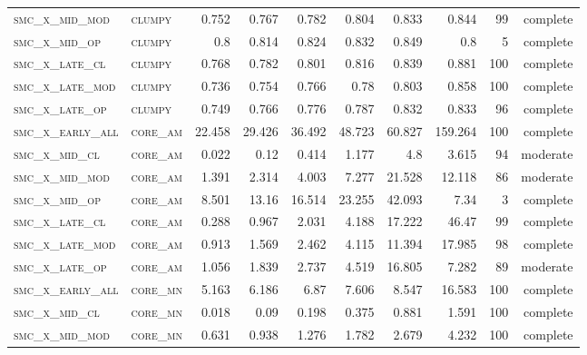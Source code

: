 \begin{landscape}
\begin{center}
\begin{footnotesize}
\begin{longtable}{llrrrrr|rrr}
\textsc{smc\_x\_mid\_mod  } & \textsc{clumpy    }   & 0.752    & 0.767    & 0.782    & 0.804    & 0.833    & 0.844    & 99  & complete \\
\textsc{smc\_x\_mid\_op   } & \textsc{clumpy    }   & 0.8      & 0.814    & 0.824    & 0.832    & 0.849    & 0.8      & 5   & complete \\
\textsc{smc\_x\_late\_cl  } & \textsc{clumpy    }   & 0.768    & 0.782    & 0.801    & 0.816    & 0.839    & 0.881    & 100 & complete \\
\textsc{smc\_x\_late\_mod } & \textsc{clumpy    }   & 0.736    & 0.754    & 0.766    & 0.78     & 0.803    & 0.858    & 100 & complete \\
\textsc{smc\_x\_late\_op  } & \textsc{clumpy    }   & 0.749    & 0.766    & 0.776    & 0.787    & 0.832    & 0.833    & 96  & complete \\
\textsc{smc\_x\_early\_all} & \textsc{core\_am  }   & 22.458   & 29.426   & 36.492   & 48.723   & 60.827   & 159.264  & 100 & complete \\
\textsc{smc\_x\_mid\_cl   } & \textsc{core\_am  }   & 0.022    & 0.12     & 0.414    & 1.177    & 4.8      & 3.615    & 94  & moderate \\
\textsc{smc\_x\_mid\_mod  } & \textsc{core\_am  }   & 1.391    & 2.314    & 4.003    & 7.277    & 21.528   & 12.118   & 86  & moderate \\
\textsc{smc\_x\_mid\_op   } & \textsc{core\_am  }   & 8.501    & 13.16    & 16.514   & 23.255   & 42.093   & 7.34     & 3   & complete \\
\textsc{smc\_x\_late\_cl  } & \textsc{core\_am  }   & 0.288    & 0.967    & 2.031    & 4.188    & 17.222   & 46.47    & 99  & complete \\
\textsc{smc\_x\_late\_mod } & \textsc{core\_am  }   & 0.913    & 1.569    & 2.462    & 4.115    & 11.394   & 17.985   & 98  & complete \\
\textsc{smc\_x\_late\_op  } & \textsc{core\_am  }   & 1.056    & 1.839    & 2.737    & 4.519    & 16.805   & 7.282    & 89  & moderate \\
\textsc{smc\_x\_early\_all} & \textsc{core\_mn  }   & 5.163    & 6.186    & 6.87     & 7.606    & 8.547    & 16.583   & 100 & complete \\
\textsc{smc\_x\_mid\_cl   } & \textsc{core\_mn  }   & 0.018    & 0.09     & 0.198    & 0.375    & 0.881    & 1.591    & 100 & complete \\
\textsc{smc\_x\_mid\_mod  } & \textsc{core\_mn  }   & 0.631    & 0.938    & 1.276    & 1.782    & 2.679    & 4.232    & 100 & complete \\

\end{longtable}
\end{footnotesize}
\end{center}
\end{landscape}
